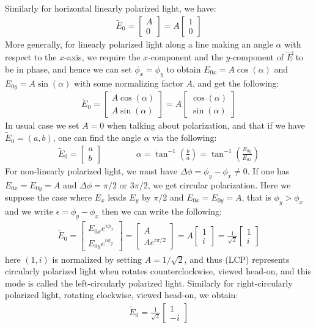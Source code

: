 \documentclass[11pt]{book}
\theoremstyle{break}
\theoremstyle{break}
\newcommand{\that}[1]{\widetilde{#1}}
\newcommand{\bmat}[1]{\begin{bmatrix} #1 \end{bmatrix}}
\begin{document}
Similarly for horizontal linearly polarized light, we have:
\begin{align*}
\that{E}_0 = \bmat{A \\ 0} = A \bmat{1 \\ 0}\tag{linear polarization along $x$-direction}
\end{align*}
More generally, for linearly polarized light along a line making an angle $\alpha$ with respect to the $x$-axis, we require the $x$-component and the $y$-component of $\vec{E}$ to be in phase, and hence we can set $\phi_x = \phi_y$ to obtain $E_{0x} = A\cos(\alpha)$ and $E_{0y} = A\sin(\alpha)$ with some normalizing factor $A$, and get the following:
\begin{align*}
\that{E}_0 = \bmat{A\cos(\alpha) \\ A\sin(\alpha)} = A\bmat{\cos(\alpha) \\ \sin(\alpha)} \tag{linearly polarization at angle $\alpha$}
\end{align*}
In usual case we set $A = 0$ when talking about polarization, and that if we have $\that{E}_0 = (a,b)$, one can find the angle $\alpha$ via the following:
\begin{align*}
\that{E}_0 = \bmat{a\\b} \qquad\qquad\alpha = \tan^{-1}\left( \frac{b}{a}\right)  = \tan^{-1}\left(\frac{E_{0y}}{E_{0x}} \right)
\end{align*} 
For non-linearly polarized light, we must have $\Delta \phi = \phi_y - \phi_x \neq 0$. If one has $E_{0x} = E_{0y} = A$ and $\Delta \phi = \pi/2$ or $3\pi/2$, we get circular polarization. Here we suppose the case where $E_x$ leads $E_y$ by $\pi/2$ and $E_{0x} = E_{0y} = A$, that is $\phi_y > \phi_x$ and we write $\epsilon = \phi_y - \phi_x$ then we can write the following:
\begin{align*}
\that{E}_0 = \bmat{E_{0x}e^{i\phi_x} \\ E_{0y}e^{i\phi_y}} = \bmat{A \\ Ae^{i\pi/2}} = A \bmat{1 \\ i} = \frac{1}{\sqrt{2}}\bmat{1 \\ i} \tag{LCP}
\end{align*}
here $(1,i)$ is normalized by setting $A = 1/\sqrt{2}$, and thus (LCP) represents circularly polarized light when  rotates counterclockwise, viewed head-on, and this mode is called the left-circularly polarized light. Similarly for right-circularly polarized light, rotating clockwise, viewed head-on, we obtain:
\begin{align*}
\that{E}_0 = \frac{1}{\sqrt{2}}\bmat{1 \\ -i} \tag{RCP}
\end{align*}
\end{document}
